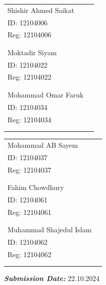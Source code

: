 \documentclass[12pt,a4paper]{article}
\begin{document}
	\begin{multicols}{2}
		\centering
		\hspace{10cm}
		\begin{tabular}{ll}
			Shishir Ahmed Saikat \\
			ID: 12104006 \\
			Reg: 12104006 \\ \\\\ 
			
			
			Moktadir Siyam \\
			ID: 12104022 \\
			Reg: 12104022 \\ \\\\ 
			
			Mohammad Omar Faruk \\
			ID: 12104034 \\
			Reg: 12104034 \\ \\\\ 
			
		\end{tabular}
		
		\hspace{10cm}
		\begin{tabular}{ll}
			Mohammad AB Sayem \\
			ID: 12104037 \\
			Reg: 12104037 \\ \\\\ 
			
			
			Fahim Chowdhury \\
			ID: 12104061 \\
			Reg: 12104061 \\ \\\\ 
			
			Muhammad Shajedul Islam \\
			ID: 12104062 \\
			Reg: 12104062 \\ \\\\ 
			
		\end{tabular}
	\end{multicols}
	
	\vspace{2cm}
	
	\hspace{8cm} \LARGE\textbf{\textit{Submission Date:}} 22.10.2024
	
\end{document}
